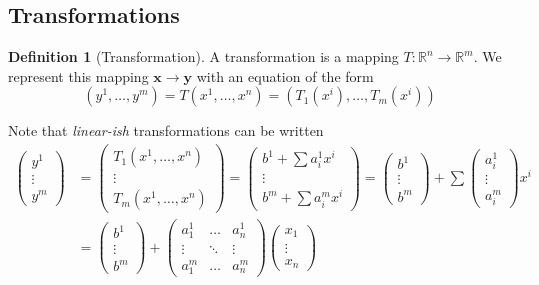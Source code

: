 \documentclass[11pt]{article}
\theoremstyle{definition}
\newtheorem{definition}[theorem]{Definition}
\begin{document}
\subsection{Transformations}
\begin{definition}[Transformation]
    A transformation is a mapping $T:\mathbb{R}^n\to\mathbb{R}^m$. We
    represent this mapping $\mathbf{x} \to \mathbf{y}$ with an equation of the form 
    $$(y^1,\dots,y^m) = T(x^1,\dots,x^n)=(T_1(x^i),\dots,T_m(x^i))$$
\end{definition}
Note that \emph{linear-ish} transformations can be written 
\begin{align*}
 \begin{pmatrix} y^1 \\ \vdots \\ y^m \end{pmatrix}
 &=\begin{pmatrix} T_1(x^1,\dots,x^n) \\ \vdots \\ T_m(x^1,\dots,x^n) \end{pmatrix}
 = \begin{pmatrix} b^1 + \sum a^1_i x^i \\ \vdots \\ b^m + \sum a^m_i x^i \end{pmatrix}
 = \begin{pmatrix} b^1 \\ \vdots \\ b^m \end{pmatrix}
 + \sum{\begin{pmatrix} a^1_i \\ \vdots \\ a^m_i \end{pmatrix}x^i} \\
 &= \begin{pmatrix} b^1 \\ \vdots \\ b^m \end{pmatrix}
 + \begin{pmatrix} a^1_1 & \dots & a^1_n \\ \vdots & \ddots & \vdots \\
 a^m_1 & \dots & a^m_n \end{pmatrix}
 \begin{pmatrix} x_1 \\ \vdots \\ x_n \end{pmatrix}
\end{align*}
\end{document}
